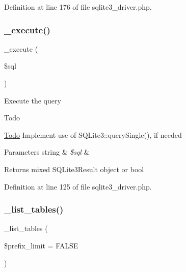 Definition at line 176 of file sqlite3\+\_\+driver.\+php.

\mbox{\label{class_c_i___d_b__sqlite3__driver_a114ab675d89bf8324a41785fb475e86d}} 
\subsubsection{\texorpdfstring{\_execute()}{\_execute()}}
{\footnotesize\ttfamily \+\_\+execute (\begin{DoxyParamCaption}\item[{}]{\$sql }\end{DoxyParamCaption})\hspace{0.3cm}{\ttfamily [protected]}}

Execute the query

\begin{DoxyRefDesc}{Todo}
\item[\mbox{\hyperlink{todo__todo000004}{Todo}}]Implement use of S\+Q\+Lite3\+::query\+Single(), if needed \end{DoxyRefDesc}

\begin{DoxyParams}[1]{Parameters}
string & {\em \$sql} & \\
\hline
\end{DoxyParams}
\begin{DoxyReturn}{Returns}
mixed S\+Q\+Lite3\+Result object or bool 
\end{DoxyReturn}


Definition at line 125 of file sqlite3\+\_\+driver.\+php.

\mbox{\label{class_c_i___d_b__sqlite3__driver_a435c0f3ce54fe7daa178baa8532ebd54}} 
\subsubsection{\texorpdfstring{\_list\_tables()}{\_list\_tables()}}
{\footnotesize\ttfamily \+\_\+list\+\_\+tables (\begin{DoxyParamCaption}\item[{}]{\$prefix\+\_\+limit = {\ttfamily FALSE} }\end{DoxyParamCaption})\hspace{0.3cm}{\ttfamily [protected]}}

